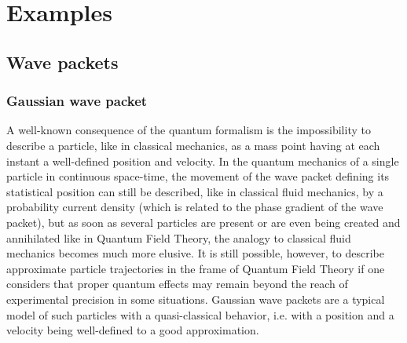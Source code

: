 \documentclass[10pt,a4paper,twoside,openany]{book}
\begin{document}
\part{Examples}

\chapter{Wave packets}
\label{Wave packets}

\section{Gaussian wave packet}

A well-known consequence of the quantum formalism is the impossibility to describe a particle, like in classical mechanics, as a mass point having at each instant a well-defined position and velocity. In the quantum mechanics of a single particle in continuous space-time, the movement of the wave packet defining its statistical position can still be described, like in classical fluid mechanics, by a probability current density (which is related to the phase gradient of the wave packet), but as soon as several particles are present or are even being created and annihilated like in Quantum Field Theory, the analogy to classical fluid mechanics becomes much more elusive. It is still possible, however, to describe approximate particle trajectories in the frame of Quantum Field Theory if one considers that proper quantum effects may remain beyond the reach of experimental precision in some situations. Gaussian wave packets are a typical model of such particles with a quasi-classical behavior, i.e. with a position and a velocity being well-defined to a good approximation.
\end{document}
